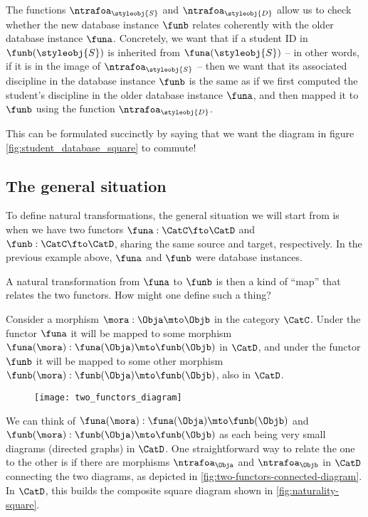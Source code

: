 The functions $\ntrafoa_\styleobj{S}$ and $\ntrafoa_\styleobj{D}$ allow us to check whether the new database instance $\funb$ relates coherently with the older database instance $\funa$. Concretely, we want that if a student ID in $ \funb(\styleobj{S})$ is inherited from $\funa(\styleobj{S})$ -- in other words, if it is in the image of $\ntrafoa_{\styleobj{S}}$ --  then we want that its associated discipline in the database instance $\funb$ is the same as if we first computed the student's discipline in the older database instance $\funa$, and then mapped it to $\funb$ using the function $\ntrafoa_{\styleobj{D}}$. 

%
\begin{marginfigure}
    \centering
    \caption{}
    \label{fig:student_database_square}
\end{marginfigure}
%

This can be formulated succinctly by saying that we want the diagram in figure \cref{fig:student_database_square} to commute!



\subsection{The general situation}

To define natural transformations, the general situation we will start from is when we have two functors $\funa : \CatC \fto \CatD$  and $\funb : \CatC \fto \CatD$, sharing the same source and target, respectively. In the previous example above, $\funa$ and $\funb$ were database instances. 

A natural transformation from $\funa$ to $\funb$ is then a kind of ``map'' that relates the two functors.
How might one define such a thing?

Consider a morphism $\mora : \Obja \mto \Objb$ in the category $\CatC$.
Under the functor $\funa$ it will be mapped to some morphism $\funa(\mora): \funa(\Obja) \mto \funb(\Objb)$ in $\CatD$, and under the functor $\funb$ it will be mapped to some other morphism $\funb(\mora): \funb(\Obja) \mto \funb(\Objb)$, also in $\CatD$.

%
\begin{figure}[h!]
    \texttt{[image: two\_functors\_diagram]}
    \caption{}
    \label{fig:two-functors-diagram}
\end{figure}
%

We can think of $\funa(\mora): \funa(\Obja) \mto \funb(\Objb)$ and $\funb(\mora): \funb(\Obja) \mto \funb(\Objb)$ as each being very small diagrams (directed graphs) in $\CatD$.
One straightforward way to relate the one to the other is if there are morphisms $\ntrafoa_\Obja$ and $\ntrafoa_\Objb$ in $\CatD$ connecting the two diagrams, as depicted in \cref{fig:two-functors-connected-diagram}.
In $\CatD$, this builds the composite square diagram shown in \cref{fig:naturality-square}.

